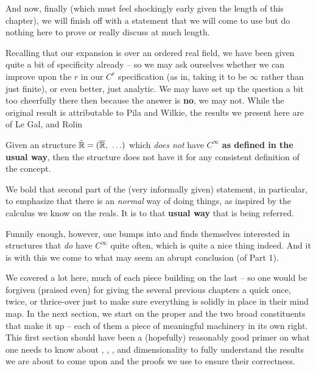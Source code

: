 And now, finally (which must feel shockingly early given the length of this chapter), we will finish off with a statement that we will come to use but do nothing here to prove or really discuss at much length.

Recalling that our expansion is over an ordered real field, we have been given quite a bit of specificity already -- so we may ask ourselves whether we can improve upon the $r$ in our $C^r$ specification (as in, taking it to be $\infty$ rather than just finite), or even better, just analytic. We may have set up the question a bit too cheerfully there then because the answer is \textbf{no}, we may not. While the original result is attributable to Pila and Wilkie, the results we present here are of Le Gal, and Rolin \cite{gal_o-minimal_2009}

\begin{proposition}
  Given an \om structure $\tilde{\mathbb{R}} = (\overline{\mathbb{R}}, \ \hdots)$ which \emph{does not} have $C^{\infty}$ \cd \textbf{as defined in the usual way}, then the structure does not have it for any consistent definition of the concept.
\end{proposition}

We bold that second part of the (very informally given) statement, in particular, to emphasize that there is an \emph{normal} way of doing things, as inspired by the calculus we know on the reals. It is to that \textbf{usual way} that is being referred.

Funnily enough, however, one bumps into and finds themselves interested in structures that \emph{do} have $C^{\infty}$ \cd quite often, which is quite a nice thing indeed. And it is with this we come to what may seem an abrupt conclusion (of Part 1).

We covered a lot here, much of each piece building on the last -- so one would be forgiven (praised even) for giving the several previous chapters a quick once, twice, or thrice-over just to make sure everything is solidly in place in their mind map. In the next section, we start on the \pwt proper and the two broad constituents that make it up -- each of them a piece of meaningful machinery in its own right. This first section should have been a (hopefully) reasonably good primer on what one needs to know about \om, \cds, \scds, and dimensionality to fully understand the results we are about to come upon and the proofs we use to ensure their correctness.
